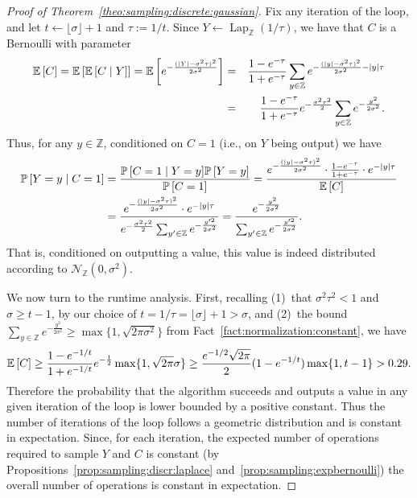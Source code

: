 \documentclass{jpcfinal} %
\newcommand{\discL}{\operatorname{Lap}_{\Z}} \newcommand{\discN}{\mathcal{N}_{\Z}}
\newcommand{\dgausss}[2]{{\discN\left(#1,#2\right)}}
\newcommand{\dgauss}[1]{\dgausss{0}{#1}}
\newcommand{\ex}[2]{{\ifx&#1& \mathbb{E} \else
\underset{#1}{\mathbb{E}} \fi \left[#2\right]}}
\newcommand{\pr}[2]{{\ifx&#1& \mathbb{P} \else
\underset{#1}{\mathbb{P}} \fi \left[#2\right]}}
\newcommand{\eqdef}{:=}
\newcommand{\Z}{\mathbb{Z}}
\begin{document}
\begin{proof}[Proof of Theorem~\ref{theo:sampling:discrete:gaussian}]
    Fix any iteration of the loop, and let $t \gets \lfloor \sigma \rfloor+1$ and $\tau\eqdef 1/t$. Since $Y\gets \discL(1/\tau)$, we have that $C$ is a Bernoulli with parameter
    \begin{eqnarray*}
          \ex{}{C} = \ex{}{ \ex{}{C \mid Y} }  =  \ex{}{ e^{-\frac{(|Y|-\sigma^2\tau)^2}{2\sigma^2}} }
          & = & \frac{1-e^{-\tau}}{1+e^{-\tau}} \sum_{y\in\Z} e^{-\frac{(|y|-\sigma^2\tau)^2}{2\sigma^2} - |y|\tau}\\
         & = &\frac{1-e^{-\tau}}{1+e^{-\tau}}e^{-\frac{\sigma^2\tau^2}{2}}\sum_{y\in\Z} e^{-\frac{y^2}{2\sigma^2}}.
    \end{eqnarray*}
    Thus, for any $y\in \Z$, conditioned on $C=1$ (i.e., on $Y$ being output) we have
    \begin{align*}
        \pr{}{ Y=y \mid C=1 } 
        &= \frac{ \pr{}{ C=1 \mid Y=y } \pr{}{Y=y} }{ \pr{}{C=1} }
        = \frac{ e^{-\frac{(|y|-\sigma^2\tau)^2}{2\sigma^2}} \cdot \frac{1-e^{-\tau}}{1+e^{-\tau}}\cdot e^{-|y|\tau} }{ \ex{}{C} }\\
        &= \frac{ e^{-\frac{(|y|-\sigma^2\tau)^2}{2\sigma^2}} \cdot e^{-|y|\tau} }{ e^{-\frac{\sigma^2\tau^2}{2}}\sum_{y'\in\Z} e^{-\frac{y'^2}{2\sigma^2}} }
        = \frac{ e^{-\frac{y^2}{2\sigma^2}} }{\sum_{y'\in\Z} e^{-\frac{y'^2}{2\sigma^2}} }.
    \end{align*}
    That is, conditioned on outputting a value, this value is indeed distributed according to $\dgauss{\sigma^2}$.
    
    We now turn to the runtime analysis. First, recalling (1)~that $\sigma^2\tau^2 < 1$ and $\sigma\ge t-1$, by our choice of $t = 1/\tau = \lfloor \sigma \rfloor + 1 > \sigma$, and (2)~the bound $\sum_{y\in\Z} e^{-\frac{y^2}{2\sigma^2}} \ge \max\{1,\sqrt{2\pi\sigma^2}\}$ from Fact~\ref{fact:normalization:constant}, we have
    $$
    \ex{}{C} \ge \frac{1-e^{-1/t}}{1+e^{-1/t}}e^{-\frac{1}{2}} \max\{1,\sqrt{2\pi}\sigma\} \ge \frac{e^{-1/2} \sqrt{2\pi}}{2} (1-e^{-1/t})\max\{1,t-1\} > 0.29.
    $$
    Therefore the probability that the algorithm succeeds and outputs a value in any given iteration of the loop is lower bounded by a positive constant. Thus the number of iterations of the loop follows a geometric distribution and is constant in expectation. Since, for each iteration, the expected number of operations required to sample $Y$ and $C$ is constant (by Propositions~\ref{prop:sampling:discr:laplace} and~\ref{prop:sampling:expbernoulli}) the overall number of operations is constant in expectation.
\end{proof}
\end{document}
